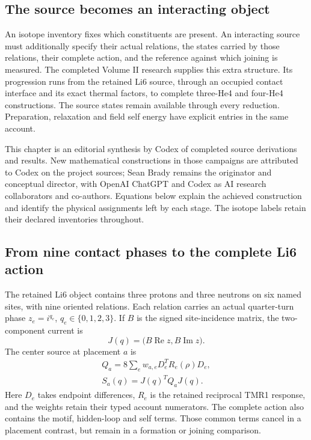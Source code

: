 \label{ch:occupied-nuclear}

\subsection{The source becomes an interacting object}

An isotope inventory fixes which constituents are present. An interacting
source must additionally specify their actual relations, the states carried
by those relations, their complete action, and the reference against which
joining is measured. The completed Volume II research supplies this extra
structure. Its progression runs from the retained Li6 source, through an
occupied contact interface and its exact thermal factors, to complete
three-He4 and four-He4 constructions. The source states remain available
through every reduction. Preparation, relaxation and field self energy have
explicit entries in the same account.

This chapter is an editorial synthesis by Codex of completed source
derivations and results. New mathematical constructions in those campaigns
are attributed to Codex on the project sources; Sean Brady remains the
originator and conceptual director, with OpenAI ChatGPT and Codex as AI
research collaborators and co-authors. Equations below explain the achieved
construction and identify the physical assignments left by each stage.
The isotope labels retain their declared inventories throughout.

\subsection{From nine contact phases to the complete Li6 action}

The retained Li6 object contains three protons and three neutrons on six
named sites, with nine oriented relations. Each relation carries an actual
quarter-turn phase \(z_e=i^{q_e}\), \(q_e\in\{0,1,2,3\}\). If \(B\) is the
signed site-incidence matrix, the two-component current is
\[
 J(q)=\bigl(B\operatorname{Re}z,B\operatorname{Im}z\bigr).
\]
The center source at placement \(a\) is
\[
\begin{gathered}
Q_a=8\sum_e w_{a,e}D_e^{T}R_e(\rho)D_e,\\
 S_a(q)=J(q)^TQ_aJ(q).
\end{gathered}
\]
Here \(D_e\) takes endpoint differences, \(R_e\) is the retained reciprocal
TMR1 response, and the weights retain their typed account numerators.
The complete action also contains the motif, hidden-loop and self terms.
Those common terms cancel in a placement contrast, but remain in a
formation or joining comparison.

